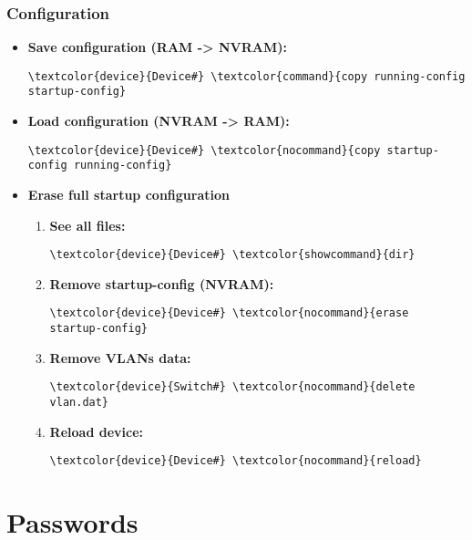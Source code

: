 \documentclass[10pt, a4paper, onecolumn, oneside, titlepage, openany]{book}
\begin{document}
\subsection{Configuration}
\begin{itemize}
    \item \textbf{Save configuration (RAM -> NVRAM):}
\begin{Verbatim}[commandchars=\\\{\}]
\textcolor{device}{Device#} \textcolor{command}{copy running-config startup-config}
\end{Verbatim}
    \item \textbf{Load configuration (NVRAM -> RAM):}
\begin{Verbatim}[commandchars=\\\{\}]
\textcolor{device}{Device#} \textcolor{nocommand}{copy startup-config running-config}
\end{Verbatim}
    \item \textbf{Erase full startup configuration}
    \begin{enumerate}
        \item \textbf{See all files:}
\begin{Verbatim}[commandchars=\\\{\}]
\textcolor{device}{Device#} \textcolor{showcommand}{dir}
\end{Verbatim}
        \item \textbf{Remove startup-config (NVRAM):}
\begin{Verbatim}[commandchars=\\\{\}]
\textcolor{device}{Device#} \textcolor{nocommand}{erase startup-config}
\end{Verbatim}
        \item \textbf{Remove VLANs data:}
\begin{Verbatim}[commandchars=\\\{\}]
\textcolor{device}{Switch#} \textcolor{nocommand}{delete vlan.dat}
\end{Verbatim}
        \item \textbf{Reload device:}
\begin{Verbatim}[commandchars=\\\{\}]
\textcolor{device}{Device#} \textcolor{nocommand}{reload}
\end{Verbatim}
    \end{enumerate}
\end{itemize}

\chapter{Passwords}
\end{document}
